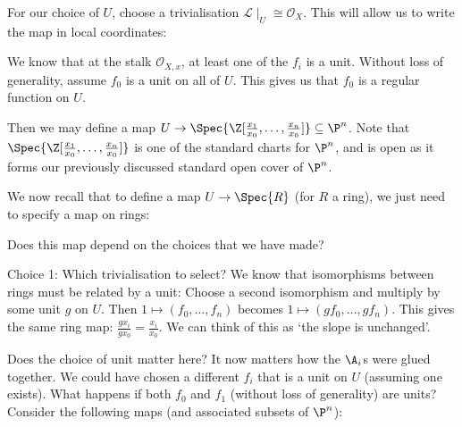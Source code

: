For our choice of $U$, choose a trivialisation $\mathcal{L}\mid_U\cong\mathcal{O}_X$.
This will allow us to write the map in local coordinates:
\begin{figure}[H]
    \centering
\end{figure}

We know that at the stalk $\mathcal{O}_{X,x}$, at least one of the $f_i$ is a unit.
Without loss of generality, assume $f_0$ is a unit on all of $U$.
This gives us that $f_0$ is a regular function on $U$.

Then we may define a map $U\to\Spec{\Z[\frac{x_1}{x_0},\dots,\frac{x_n}{x_0}]}\subseteq\P^n$.
Note that $\Spec{\Z[\frac{x_1}{x_0},\dots,\frac{x_n}{x_0}]}$ is one of the standard charts for $\P^n$, and is open as it forms our previously discussed standard open cover of $\P^n$.

We now recall that to define a map $U\to\Spec{R}$ (for $R$ a ring), we just need to specify a map on rings:
\begin{figure}[H]
    \centering
\end{figure}

Does this map depend on the choices that we have made?

Choice 1: Which trivialisation to select? We know that isomorphisms between rings must be related by a unit:
Choose a second isomorphism and multiply by some unit $g$ on $U$.
Then $1\mapsto(f_0,\dots,f_n)$ becomes $1\mapsto(gf_0,\dots,gf_n)$.
This gives the same ring map: $\frac{gx_i}{gx_0}=\frac{x_i}{x_0}$.
We can think of this as `the slope is unchanged'.

Does the choice of unit matter here?
It now matters how the $\A_i$s were glued together.
We could have chosen a different $f_i$ that is a unit on $U$ (assuming one exists).
What happens if both $f_0$ and $f_1$ (without loss of generality) are units?
Consider the following maps (and associated subsets of $\P^n$):
\begin{figure}[H]
    \centering
\end{figure}


